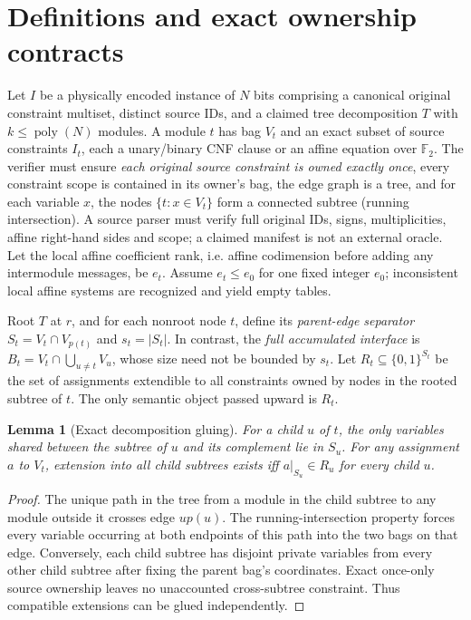 \documentclass[11pt]{article}
\newtheorem{lemma}[theorem]{Lemma}
\newcommand{\F}{\mathbb F_2}
\begin{document}
\section{Definitions and exact ownership contracts}
Let $I$ be a physically encoded instance of $N$ bits comprising a canonical original constraint multiset, distinct source IDs, and a claimed tree decomposition $T$ with $k\le\operatorname{poly}(N)$ modules.  A module $t$ has bag $V_t$ and an exact subset of source constraints $I_t$, each a unary/binary CNF clause or an affine equation over $\F$.  The verifier must ensure \emph{each original source constraint is owned exactly once}, every constraint scope is contained in its owner's bag, the edge graph is a tree, and for each variable $x$, the nodes $\{t:x\in V_t\}$ form a connected subtree (running intersection).  A source parser must verify full original IDs, signs, multiplicities, affine right-hand sides and scope; a claimed manifest is not an external oracle.  Let the local affine coefficient rank, i.e. affine codimension before adding any intermodule messages, be $e_t$.  Assume $e_t\le e_0$ for one fixed integer $e_0$; inconsistent local affine systems are recognized and yield empty tables.

Root $T$ at $r$, and for each nonroot node $t$, define its \emph{parent-edge separator} $S_t=V_t\cap V_{p(t)}$ and $s_t=|S_t|$.  In contrast, the \emph{full accumulated interface} is $B_t=V_t\cap\bigcup_{u\ne t}V_u$, whose size need not be bounded by $s_t$.  Let $R_t\subseteq\{0,1\}^{S_t}$ be the set of assignments extendible to all constraints owned by nodes in the rooted subtree of $t$.  The only semantic object passed upward is $R_t$.

\begin{lemma}[Exact decomposition gluing]\label{lem:gluing}
For a child $u$ of $t$, the only variables shared between the subtree of $u$ and its complement lie in $S_u$.  For any assignment $a$ to $V_t$, extension into all child subtrees exists iff $a|_{S_u}\in R_u$ for every child $u$.
\end{lemma}
\begin{proof}
The unique path in the tree from a module in the child subtree to any module outside it crosses edge $up(u)$.  The running-intersection property forces every variable occurring at both endpoints of this path into the two bags on that edge.  Conversely, each child subtree has disjoint private variables from every other child subtree after fixing the parent bag's coordinates.  Exact once-only source ownership leaves no unaccounted cross-subtree constraint.  Thus compatible extensions can be glued independently.
\end{proof}
\end{document}

